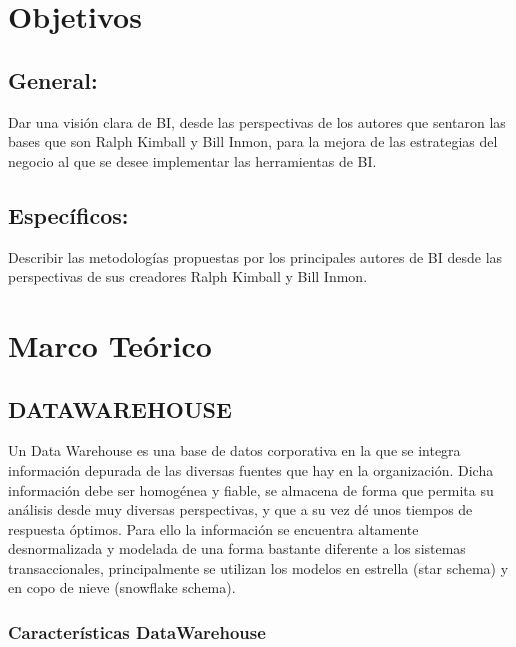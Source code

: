 \documentclass[%
 reprint,
 amsmath,amssymb,
 aps,
]{revtex4-1}
\begin{document}
\section{Objetivos}\label{sec:2}
\subsection{General:}
Dar una visión clara de BI, desde las perspectivas de los autores que sentaron las bases que son Ralph Kimball y Bill Inmon, para la mejora de las estrategias del negocio al que se desee implementar las herramientas de BI.
\subsection{Específicos:}
 Describir las metodologías propuestas por los principales autores de BI desde las perspectivas de sus creadores Ralph Kimball y Bill Inmon.


\section {Marco Teórico}

\subsection{DATAWAREHOUSE}	
Un Data Warehouse es una base de datos corporativa en la que se integra información depurada de las diversas fuentes que hay en la organización. Dicha
información debe ser homogénea y fiable, se almacena de forma que permita su análisis desde muy diversas perspectivas, y que a su vez dé unos tiempos de
respuesta óptimos. Para ello la información se encuentra altamente desnormalizada y modelada de una forma bastante diferente a los sistemas transaccionales,
principalmente se utilizan los modelos en estrella (star schema) y en copo de nieve (snowflake schema).\cite{robles3}

\subsubsection{Características DataWarehouse}	
\end{document}
